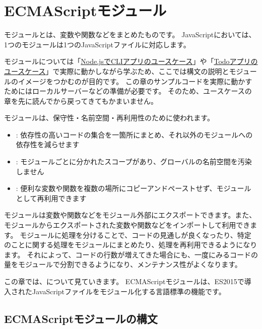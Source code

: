 \hypertarget{module}{%
\chapter[ECMAScriptモジュール]{ECMAScriptモジュール\,\protect{}}\label{module}}
\thispagestyle{frontheadings}

モジュールとは、変数や関数などをまとめたものです。
JavaScriptにおいては、1つのモジュールは1つのJavaScriptファイルに対応します。

モジュールについては「\hyperlink{node-cli}{Node.jsでCLIアプリのユースケース}」や「\hyperlink{todo-app}{Todoアプリのユースケース}」で実際に動かしながら学ぶため、ここでは構文の説明とモジュールのイメージをつかむのが目的です。
この章のサンプルコードを実際に動かすためにはローカルサーバーなどの準備が必要です。
そのため、ユースケースの章を先に読んでから戻ってきてもかまいません。

モジュールは、保守性・名前空間・再利用性のために使われます。

\begin{itemize}
\item
  :
  依存性の高いコードの集合を一箇所にまとめ、それ以外のモジュールへの依存性を減らせます
\item
  :
  モジュールごとに分かれたスコープがあり、グローバルの名前空間を汚染しません
\item
  :
  便利な変数や関数を複数の場所にコピーアンドペーストせず、モジュールとして再利用できます
\end{itemize}

モジュールは変数や関数などをモジュール外部にエクスポートできます。また、モジュールからエクスポートされた変数や関数などをインポートして利用できます。
モジュールに処理を分けることで、コードの見通しが良くなったり、特定のことに関する処理をモジュールにまとめたり、処理を再利用できるようになります。
それによって、コードの行数が増えてきた場合にも、一度にみるコードの量をモジュールで分割できるようになり、メンテナンス性がよくなります。

この章では、\textbf{}について見ていきます。
ECMAScriptモジュールは、ES2015で導入されたJavaScriptファイルをモジュール化する言語標準の機能です。

\hypertarget{es-module-syntax}{%
\section{ECMAScriptモジュールの構文}\label{es-module-syntax}}

